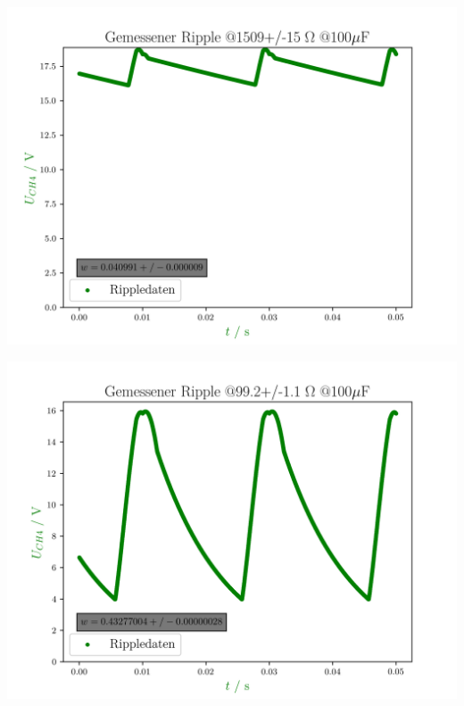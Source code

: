 \documentclass[11pt,ngerman]{scrartcl}
\begin{document}
\begin{center}
	\begin{minipage}[t]{0.8\textwidth}
		\includegraphics[width=\textwidth]{./figures/halbleiter/Versuch3/spannung_ripple_1509.0.png}
		\label{fig:spannung_ripple_1509}
	\end{minipage}
\end{center}

\begin{center}
	\begin{minipage}[t]{0.8\textwidth}
		\includegraphics[width=\textwidth]{./figures/halbleiter/Versuch3/spannung_ripple_99.2.png}
		\label{fig:spannung_ripple_100}
	\end{minipage}
\end{center}
\end{document}
